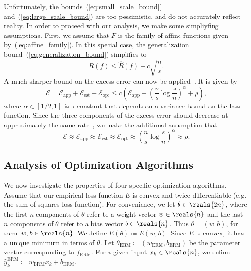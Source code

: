 \documentclass[11pt,a4paper]{article}
\numberwithin{equation}{section}
\newcommand{\apperr}{\mathcal{E}_{\mathrm{app}}}
\newcommand{\esterr}{\mathcal{E}_{\mathrm{est}}}
\newcommand{\opterr}{\mathcal{E}_{\mathrm{opt}}}
\begin{document}
Unfortunately, the bounds~(\ref{eq:small_scale_bound})
and~(\ref{eq:large_scale_bound}) are too pessimistic, and do not accurately
reflect reality. In order to proceed with our analysis, we make some simpliyfing
assumptions. First, we assume that $F$ is the family of affine functions given
by~(\ref{eq:affine_family}). In this special case, the generalization
bound~(\ref{eq:generalization_bound}) simplifies to
\[
	R(f) \leq \hat{R}(f) + c \sqrt{\frac{n}{s}}.
\]
A much sharper bound on the excess error can now be
applied~\citep{bousquet2008tradeoffs}. It is given by
\begin{equation}
	\mathcal{E}
	= \apperr + \esterr + \opterr
	\leq c \left( \apperr + \left(\frac{n}{s}\log\frac{s}{n}\right)^\alpha +
		\rho \right),
	\label{eq:fast_rate_bound}
\end{equation}
where $\alpha \in [1/2, 1]$ is a constant that depends on a variance bound on
the loss function. Since the three components of the excess error should
decrease at approximately the same rate~\citep{bousquet2008tradeoffs}, we make
the additional assumption that
\begin{equation}
	\mathcal{E} \approx \apperr \approx \esterr \approx \opterr \approx
		\left(\frac{n}{s}\log\frac{s}{n}\right)^\alpha \approx \rho.
	\label{eq:error_equiv}
\end{equation}

\subsection{Analysis of Optimization Algorithms}

We now investigate the properties of four specific optimization algorithms.
Assume that our empirical loss function $E$ is convex and twice differentiable
(e.g. the sum-of-squares loss function). For convenience, we let $\theta \in
\reals{2n}$, where the first $n$ components of $\theta$ refer to a weight vector
$w \in \reals{n}$ and the last $n$ components of $\theta$ refer to a bias vector
$b \in \reals{n}$. Thus $\theta = (w, b)$, for some $w, b \in \reals{n}$. We
define $E(\theta) \coloneqq E(w, b)$. Since $E$ is convex, it has a unique
minimum in terms of $\theta$. Let $\theta_{\text{ERM}} \coloneqq
(w_{\text{ERM}}, b_{\text{ERM}})$ be the parameter vector corresponding to
$f_{\text{ERM}}$. For a given input $x_k \in \reals{n}$, we define
$\hat{y}_k^{\text{ERM}} \coloneqq w_{\text{ERM}} x_k + b_{\text{ERM}}$.
\end{document}
